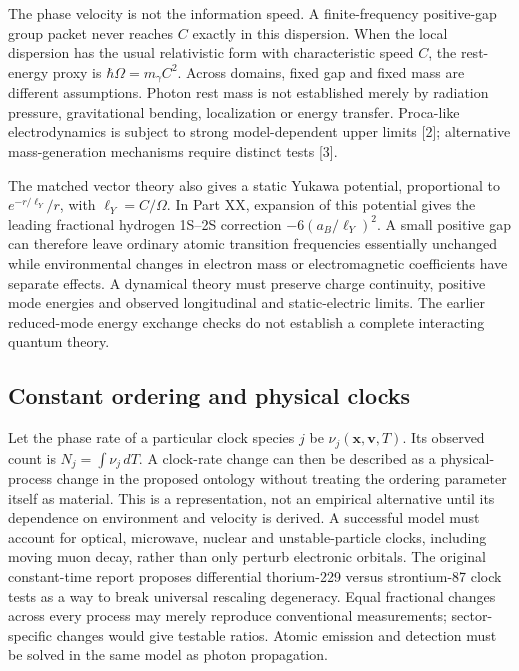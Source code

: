 \documentclass[
  11pt,
  twoside]{article}
\begin{document}
The phase velocity is not the information speed. A finite-frequency
positive-gap group packet never reaches \(C\) exactly in this
dispersion. When the local dispersion has the usual relativistic form
with characteristic speed \(C\), the rest-energy proxy is
\(\hbar\Omega=m_\gamma C^2\). Across domains, fixed gap and fixed mass
are different assumptions. Photon rest mass is not established merely by
radiation pressure, gravitational bending, localization or energy
transfer. Proca-like electrodynamics is subject to strong
model-dependent upper limits {[}2{]}; alternative mass-generation
mechanisms require distinct tests {[}3{]}.

The matched vector theory also gives a static Yukawa potential,
proportional to \(e^{-r/\ell_Y}/r\), with \(\ell_Y=C/\Omega\). In Part
XX, expansion of this potential gives the leading fractional hydrogen
1S--2S correction \(-6(a_B/\ell_Y)^2\). A small positive gap can
therefore leave ordinary atomic transition frequencies essentially
unchanged while environmental changes in electron mass or
electromagnetic coefficients have separate effects. A dynamical theory
must preserve charge continuity, positive mode energies and observed
longitudinal and static-electric limits. The earlier reduced-mode energy
exchange checks do not establish a complete interacting quantum theory.

\subsection{Constant ordering and physical
clocks}\label{constant-ordering-and-physical-clocks}

Let the phase rate of a particular clock species \(j\) be
\(\nu_j(\mathbf{x},\mathbf{v},T)\). Its observed count is
\(N_j=\int\nu_j\,dT\). A clock-rate change can then be described as a
physical-process change in the proposed ontology without treating the
ordering parameter itself as material. This is a representation, not an
empirical alternative until its dependence on environment and velocity
is derived. A successful model must account for optical, microwave,
nuclear and unstable-particle clocks, including moving muon decay,
rather than only perturb electronic orbitals. The original constant-time
report proposes differential thorium-229 versus strontium-87 clock tests
as a way to break universal rescaling degeneracy. Equal fractional
changes across every process may merely reproduce conventional
measurements; sector-specific changes would give testable ratios. Atomic
emission and detection must be solved in the same model as photon
propagation.
\end{document}
